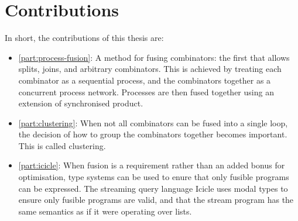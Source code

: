 \section{Contributions}

In short, the contributions of this thesis are:

\begin{itemize}
\item
\autoref{part:process-fusion}:
A method for fusing combinators: the first that allows splits, joins, and arbitrary combinators.
This is achieved by treating each combinator as a sequential process, and the combinators together as a concurrent process network.
Processes are then fused together using an extension of synchronised product.


\item
\autoref{part:clustering}:
When not all combinators can be fused into a single loop, the decision of how to group the combinators together becomes important.
This is called clustering.

\item
\autoref{part:icicle}:
When fusion is a requirement rather than an added bonus for optimisation, type systems can be used to enure that only fusible programs can be expressed.
The streaming query language Icicle uses modal types to ensure only fusible programs are valid, and that the stream program has the same semantics as if it were operating over lists.
\end{itemize}


